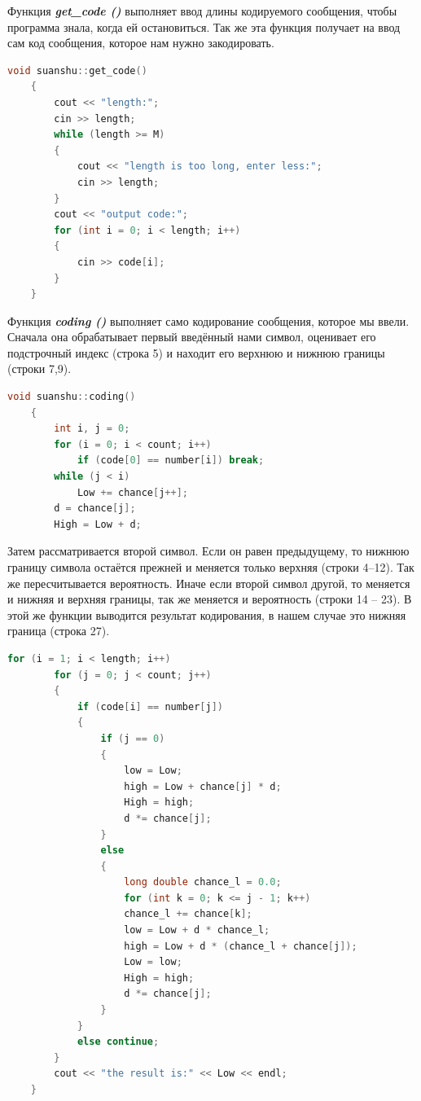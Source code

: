 \documentclass[12pt]{article}
\begin{document}
Функция \textbf{\textit{get\_code ()}} выполняет ввод длины кодируемого сообщения, чтобы программа знала, когда ей остановиться. Так же эта функция получает на ввод сам код сообщения, которое нам нужно закодировать.

\begin{lstlisting}[language=C,style=C]
    void suanshu::get_code()
    {
        cout << "length:";
        cin >> length;
        while (length >= M)
        {
            cout << "length is too long, enter less:";
            cin >> length;
        }
        cout << "output code:";
        for (int i = 0; i < length; i++)
        {
            cin >> code[i];
        }
    }

\end{lstlisting}

Функция \textbf{\textit{coding ()}} выполняет само кодирование сообщения, которое мы ввели. Сначала она обрабатывает первый введённый нами символ, оценивает его подстрочный индекс (строка 5) и находит его верхнюю и нижнюю границы (строки 7,9).

\begin{lstlisting}[language=C,style=C]
    void suanshu::coding()
    {
        int i, j = 0;
        for (i = 0; i < count; i++)
            if (code[0] == number[i]) break;
        while (j < i)
            Low += chance[j++];
        d = chance[j];
        High = Low + d;

\end{lstlisting}

Затем рассматривается второй символ. Если он равен предыдущему, то нижнюю границу символа остаётся прежней и меняется только верхняя (строки 4--12). Так же пересчитывается вероятность. Иначе если второй символ другой, то меняется и нижняя и верхняя границы, так же меняется и вероятность (строки 14 -- 23). В этой же функции выводится результат кодирования, в нашем случае это нижняя граница (строка 27).

\begin{lstlisting}[language=C,style=C]
    for (i = 1; i < length; i++)
        for (j = 0; j < count; j++)
        {
            if (code[i] == number[j])
            {
                if (j == 0)
                {
                    low = Low;
                    high = Low + chance[j] * d;
                    High = high;
                    d *= chance[j];
                }
                else
                {
                    long double chance_l = 0.0;
                    for (int k = 0; k <= j - 1; k++)
                    chance_l += chance[k];
                    low = Low + d * chance_l;
                    high = Low + d * (chance_l + chance[j]);
                    Low = low;
                    High = high;
                    d *= chance[j];
                }
            }
            else continue;
        }
        cout << "the result is:" << Low << endl;
    }

\end{lstlisting}
\end{document}
